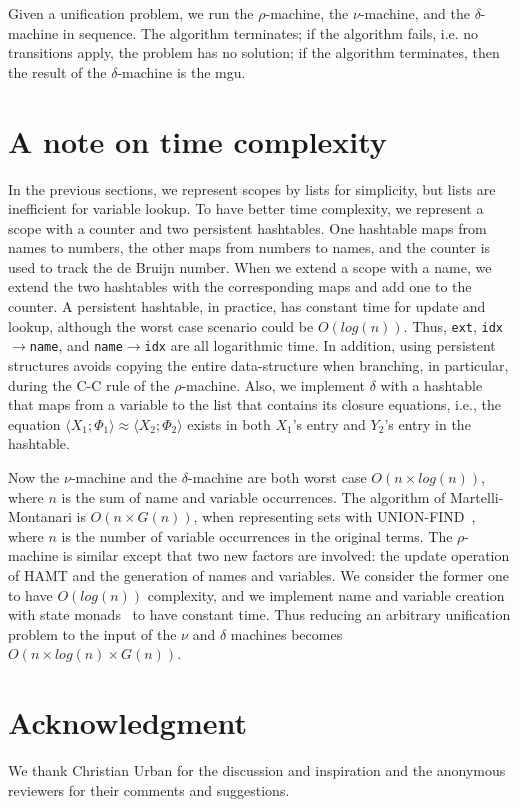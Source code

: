 \documentclass[a4paper,UKenglish]{lipics-v2016}
\newcommand{\clos}[2] {
\langle #1; #2 \rangle
}
\newcommand{\aeq}[4] {
\clos{#1}{#2} \approx \clos{#3}{#4}
}
\newcommand*{\transname}[1]{\textsc{#1}}
\begin{document}
\begin{conjecture}\label{lemma:rmachine}
  Given a unification problem, we run the $\rho$-machine,
  the $\nu$-machine, and the $\delta$-machine in sequence.
  The algorithm terminates;
  if the algorithm fails, i.e. no transitions apply,
  the problem has no solution;
  if the algorithm terminates, then the result of the $\delta$-machine
  is the mgu.
\end{conjecture}

\section{A note on time complexity}
\label{efficiency}

In the previous sections, we represent scopes by lists for simplicity,
but lists are inefficient for variable lookup. To have better time
complexity, we represent a scope with a counter and two persistent
hashtables. One
hashtable maps from names to numbers, the other maps from numbers to
names, and the counter is used to track the de Bruijn number. When we
extend a scope with a name, we extend the two hashtables with the
corresponding maps and add one to the counter. A persistent
hashtable, in practice, has constant time for update and lookup,
although the worst case scenario could be $O(log(n))$. Thus,
\texttt{ext}, \texttt{idx$\rightarrow$name}, and
\texttt{name$\rightarrow$idx} are all logarithmic time. In addition,
using persistent structures avoids copying the entire data-structure
when branching, in particular, during the \transname{C-C} rule of
the $\rho$-machine.
Also, we implement $\delta$ with a hashtable that maps from a variable to
the list that contains its closure equations,
i.e., the equation $\aeq{X_1}{\Phi_1}{X_2}{\Phi_2}$
exists in both $X_1$'s entry and $Y_2$'s entry in the hashtable.

Now the $\nu$-machine and the
$\delta$-machine are both worst case $O(n \times log(n))$,
where $n$ is the sum of name and variable occurrences.
The algorithm of Martelli-Montanari is $O(n \times G(n))$, when
representing sets with UNION-FIND~\citep{tarjan_efficiency_1975}, where
$n$ is the number of variable occurrences in the original terms. The
$\rho$-machine is similar except that two new factors are involved:
the update operation of HAMT and the generation of names and
variables. We consider the former one to have $O(log(n))$ complexity,
and we implement name and variable creation with state
monads~\citep{moggi_notions_1991} to have
constant time. Thus reducing an arbitrary unification problem to the
input of the $\nu$ and $\delta$ machines becomes $O(n \times log(n) \times
G(n))$.

\section*{Acknowledgment}
We thank Christian Urban for the discussion and inspiration
and the anonymous reviewers for their comments and suggestions.


\end{document}

